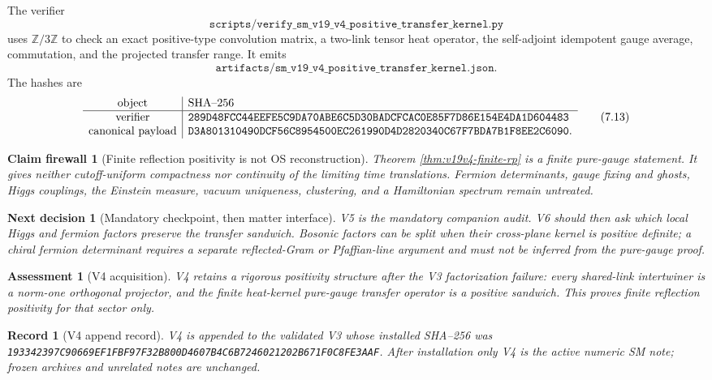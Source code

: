 \documentclass[11pt]{article}
\newtheorem{firewall}[theorem]{Claim firewall}
\newtheorem{decision}[theorem]{Next decision}
\newtheorem{assessment}[theorem]{Assessment}
\newtheorem{record}[theorem]{Record}
\theoremstyle{remark}
\begin{document}
The verifier
\[
 \texttt{scripts/verify\_sm\_v19\_v4\_positive\_transfer\_kernel.py} \tag{7.11}
\]
uses \(\mathbb Z/3\mathbb Z\) to check an exact positive-type convolution
matrix, a two-link tensor heat operator, the self-adjoint idempotent gauge
average, commutation, and the projected transfer range.  It emits
\[
 \texttt{artifacts/sm\_v19\_v4\_positive\_transfer\_kernel.json}.   \tag{7.12}
\]
The hashes are
\[
\begin{array}{c|l}
\hbox{object}&\hbox{SHA--256}\\ \hline
\hbox{verifier}&
\texttt{289D48FCC44EEFE5C9DA70ABE6C5D30BADCFCAC0E85F7D86E154E4DA1D604483}\\
\hbox{canonical payload}&
\texttt{D3A801310490DCF56C8954500EC261990D4D2820340C67F7BDA7B1F8EE2C6090}.
\end{array}                                                   \tag{7.13}
\]

\begin{firewall}[Finite reflection positivity is not OS reconstruction]
\label{fire:v19v4}
Theorem \ref{thm:v19v4-finite-rp} is a finite pure-gauge statement.
It gives neither cutoff-uniform compactness nor continuity of the limiting
time translations.  Fermion determinants, gauge fixing and ghosts, Higgs
couplings, the Einstein measure, vacuum uniqueness, clustering, and a
Hamiltonian spectrum remain untreated.
\end{firewall}

\begin{decision}[Mandatory checkpoint, then matter interface]
\label{dec:v19v4-next}
V5 is the mandatory companion audit.  V6 should then ask which local Higgs
and fermion factors preserve the transfer sandwich.  Bosonic factors can be
split when their cross-plane kernel is positive definite; a chiral fermion
determinant requires a separate reflected-Gram or Pfaffian-line argument
and must not be inferred from the pure-gauge proof.
\end{decision}

\begin{assessment}[V4 acquisition]
\label{ass:v19v4}
V4 retains a rigorous positivity structure after the V3 factorization
failure: every shared-link intertwiner is a norm-one orthogonal projector,
and the finite heat-kernel pure-gauge transfer operator is a positive
sandwich.  This proves finite reflection positivity for that sector only.
\end{assessment}

\begin{record}[V4 append record]
\label{rec:v19v4}
V4 is appended to the validated V3 whose installed SHA--256 was
\texttt{193342397C90669EF1FBF97F32B800D4607B4C6B7246021202B671F0C8FE3AAF}.
After installation only V4 is the active numeric SM note; frozen archives
and unrelated notes are unchanged.
\end{record}
\end{document}
